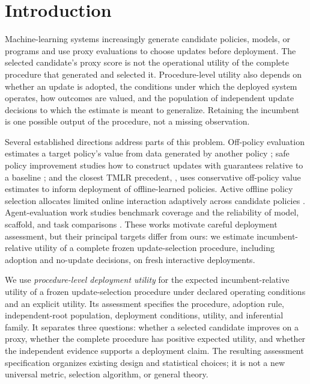 \documentclass[10pt,letterpaper]{article}
\begin{document}
\section{Introduction}
Machine-learning systems increasingly generate candidate policies, models, or programs and use proxy evaluations to choose updates before deployment. The selected candidate's proxy score is not the operational utility of the complete procedure that generated and selected it. Procedure-level utility also depends on whether an update is adopted, the conditions under which the deployed system operates, how outcomes are valued, and the population of independent update decisions to which the estimate is meant to generalize. Retaining the incumbent is one possible output of the procedure, not a missing observation.

Several established directions address parts of this problem. Off-policy evaluation estimates a target policy's value from data generated by another policy \citep{jiang2016,thomas2015}; safe policy improvement studies how to construct updates with guarantees relative to a baseline \citep{laroche2019}; and the closest TMLR precedent, \citet{abdelwahed2024conservative}, uses conservative off-policy value estimates to inform deployment of offline-learned policies. Active offline policy selection allocates limited online interaction adaptively across candidate policies \citep{konyushkova2021active}. Agent-evaluation work studies benchmark coverage and the reliability of model, scaffold, and task comparisons \citep{kapoor2026,hardy2026,kehkashan2026}. These works motivate careful deployment assessment, but their principal targets differ from ours: we estimate incumbent-relative utility of a complete frozen update-selection procedure, including adoption and no-update decisions, on fresh interactive deployments.

We use \emph{procedure-level deployment utility} for the expected incumbent-relative utility of a frozen update-selection procedure under declared operating conditions and an explicit utility. Its assessment specifies the procedure, adoption rule, independent-root population, deployment conditions, utility, and inferential family. It separates three questions: whether a selected candidate improves on a proxy, whether the complete procedure has positive expected utility, and whether the independent evidence supports a deployment claim. The resulting assessment specification organizes existing design and statistical choices; it is not a new universal metric, selection algorithm, or general theory.
\end{document}
